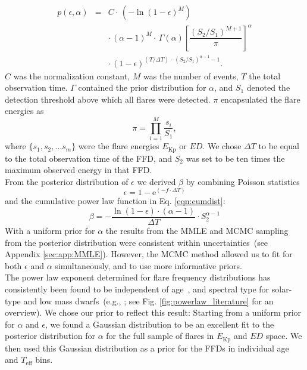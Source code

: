 \documentclass{aa}
\begin{document}
\begin{eqnarray}
\label{joint_posterior}
p(\epsilon, \alpha) &=& C \cdot\, (-\ln(1 - \epsilon)^{M})\nonumber\\
                    && \cdot\, (\alpha-1)^M \cdot\, \Gamma(\alpha) \left[\dfrac{(S_2 / S_1)^{M+1}}{\pi} \right]^{\alpha}\nonumber\\
                    && \cdot\, (1-\epsilon)^{(T / \Delta T) \,\cdot\, (S_2 /S_1)^{\alpha-1} -1 }.
\end{eqnarray}
$C$ was the normalization constant, $M$ was the number of events, $T$ the total observation time. $\Gamma$ contained the prior distribution for $\alpha$, and $S_1$ denoted the detection threshold above which all flares were detected. $\pi$ encapsulated the flare energies as
\begin{equation}
    \pi = \displaystyle \prod_{i=1}^M \dfrac{s_i}{S_1},
\end{equation}
where $\{s_1,s_2,...s_m\}$ were the flare energies $E_\mathrm{Kp}$ or $ED$. We chose $\Delta T$ to be equal to the total observation time of the FFD, and $S_2$ was set to be ten times the maximum observed energy in that FFD.
\\
From the posterior distribution of $\epsilon$ we derived $\beta$ by combining Poisson statistics 
\begin{equation}
\epsilon = 1 - \mathrm{e}^{(-f\cdot\Delta T)}
\label{poissonstats}
\end{equation}
and the cumulative power law function in Eq. \ref{eqn:cumdist}:
\begin{equation}
\beta = - \dfrac{\ln(1 - \epsilon)\cdot (\alpha -1)}{\Delta T} \cdot S_2^{\alpha -1}
\label{eqn:epstobeta}
\end{equation}
With a uniform prior for $\alpha$ the results from the MMLE and MCMC sampling from the posterior distribution were consistent within uncertainties~(see Appendix \ref{sec:app:MMLE}). However, the MCMC method allowed us to fit for both $\epsilon$ and $\alpha$ simultaneously, and to use more informative priors. 
\\
The power law exponent determined for flare frequency distributions has consistently been found to be independent of age~\citep{davenport2019}, and spectral type for solar-type and low mass dwarfs~(e.g., \citealt{chang2015, howard2019, lin2019}; see Fig. \ref{fig:powerlaw_literature} for an overview). We chose our prior to reflect this result: Starting from a uniform prior for $\alpha$ and $\epsilon$, we found a Gaussian distribution to be an excellent fit to the posterior distribution for $\alpha$ for the full sample of flares in $E_\mathrm{Kp}$ and $ED$ space. We then used this Gaussian distribution as a prior for the FFDs in individual age and $T_\mathrm{eff}$ bins. 
\end{document}

